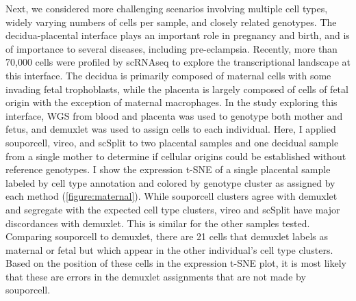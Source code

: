 \par{
Next, we considered more challenging scenarios involving multiple cell types, widely varying numbers of cells per sample, and closely related genotypes. The decidua-placental interface plays an important role in pregnancy and birth, and is of importance to several diseases, including pre-eclampsia\cite{maternalfetal}. Recently, more than 70,000 cells were profiled by scRNAseq\cite{nkhla} to explore the transcriptional landscape at this interface. The decidua is primarily composed of maternal cells with some invading fetal trophoblasts, while the placenta is largely composed of cells of fetal origin with the exception of maternal macrophages. In the study exploring this interface\cite{maternalfetal}, WGS from blood and placenta was used to genotype both mother and fetus, and demuxlet was used to assign cells to each individual. Here, I applied souporcell, vireo, and scSplit to two placental samples and one decidual sample from a single mother to determine if cellular origins could be established without reference genotypes. I show the expression t-SNE of a single placental sample labeled by cell type annotation\cite{maternalfetal} and colored by genotype cluster as assigned by each method (\ref{figure:maternal}). While souporcell clusters agree with demuxlet and segregate with the expected cell type clusters, vireo and scSplit have major discordances with demuxlet. This is similar for the other samples tested. Comparing souporcell to demuxlet, there are 21 cells that demuxlet labels as maternal or fetal but which appear in the other individual's cell type clusters. Based on the position of these cells in the expression t-SNE plot, it is most likely that these are errors in the demuxlet assignments that are not made by souporcell. 
}


